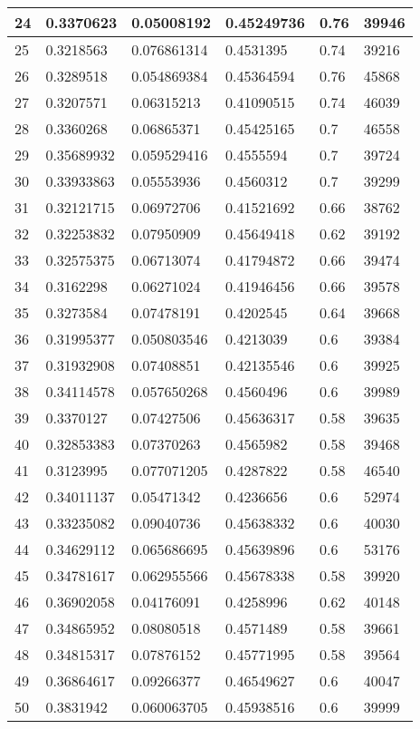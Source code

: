 \begin{longtable}{|l|l|l|l|l|l|}
24 & 0.3370623 & 0.05008192 & 0.45249736 & 0.76 & 39946 \\ \hline 
25 & 0.3218563 & 0.076861314 & 0.4531395 & 0.74 & 39216 \\ \hline 
26 & 0.3289518 & 0.054869384 & 0.45364594 & 0.76 & 45868 \\ \hline 
27 & 0.3207571 & 0.06315213 & 0.41090515 & 0.74 & 46039 \\ \hline 
28 & 0.3360268 & 0.06865371 & 0.45425165 & 0.7 & 46558 \\ \hline 
29 & 0.35689932 & 0.059529416 & 0.4555594 & 0.7 & 39724 \\ \hline 
30 & 0.33933863 & 0.05553936 & 0.4560312 & 0.7 & 39299 \\ \hline 
31 & 0.32121715 & 0.06972706 & 0.41521692 & 0.66 & 38762 \\ \hline 
32 & 0.32253832 & 0.07950909 & 0.45649418 & 0.62 & 39192 \\ \hline 
33 & 0.32575375 & 0.06713074 & 0.41794872 & 0.66 & 39474 \\ \hline 
34 & 0.3162298 & 0.06271024 & 0.41946456 & 0.66 & 39578 \\ \hline 
35 & 0.3273584 & 0.07478191 & 0.4202545 & 0.64 & 39668 \\ \hline 
36 & 0.31995377 & 0.050803546 & 0.4213039 & 0.6 & 39384 \\ \hline 
37 & 0.31932908 & 0.07408851 & 0.42135546 & 0.6 & 39925 \\ \hline 
38 & 0.34114578 & 0.057650268 & 0.4560496 & 0.6 & 39989 \\ \hline 
39 & 0.3370127 & 0.07427506 & 0.45636317 & 0.58 & 39635 \\ \hline 
40 & 0.32853383 & 0.07370263 & 0.4565982 & 0.58 & 39468 \\ \hline 
41 & 0.3123995 & 0.077071205 & 0.4287822 & 0.58 & 46540 \\ \hline 
42 & 0.34011137 & 0.05471342 & 0.4236656 & 0.6 & 52974 \\ \hline 
43 & 0.33235082 & 0.09040736 & 0.45638332 & 0.6 & 40030 \\ \hline 
44 & 0.34629112 & 0.065686695 & 0.45639896 & 0.6 & 53176 \\ \hline 
45 & 0.34781617 & 0.062955566 & 0.45678338 & 0.58 & 39920 \\ \hline 
46 & 0.36902058 & 0.04176091 & 0.4258996 & 0.62 & 40148 \\ \hline 
47 & 0.34865952 & 0.08080518 & 0.4571489 & 0.58 & 39661 \\ \hline 
48 & 0.34815317 & 0.07876152 & 0.45771995 & 0.58 & 39564 \\ \hline 
49 & 0.36864617 & 0.09266377 & 0.46549627 & 0.6 & 40047 \\ \hline 
50 & 0.3831942 & 0.060063705 & 0.45938516 & 0.6 & 39999 \\ \hline 
\end{longtable}